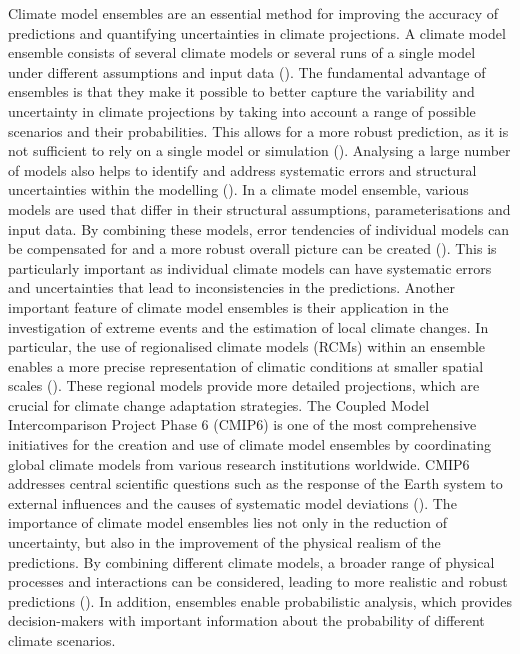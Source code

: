 \documentclass[
]{krantz}
\begin{document}
Climate model ensembles are an essential method for improving the accuracy of predictions and quantifying uncertainties in climate projections. A climate model ensemble consists of several climate models or several runs of a single model under different assumptions and input data (\citet{eyring2016overview}). The fundamental advantage of ensembles is that they make it possible to better capture the variability and uncertainty in climate projections by taking into account a range of possible scenarios and their probabilities. This allows for a more robust prediction, as it is not sufficient to rely on a single model or simulation (\citet{falloon2014ensembles}). Analysing a large number of models also helps to identify and address systematic errors and structural uncertainties within the modelling (\citet{maher2021large}).
In a climate model ensemble, various models are used that differ in their structural assumptions, parameterisations and input data. By combining these models, error tendencies of individual models can be compensated for and a more robust overall picture can be created (\citet{semenov2010use}). This is particularly important as individual climate models can have systematic errors and uncertainties that lead to inconsistencies in the predictions.
Another important feature of climate model ensembles is their application in the investigation of extreme events and the estimation of local climate changes. In particular, the use of regionalised climate models (RCMs) within an ensemble enables a more precise representation of climatic conditions at smaller spatial scales (\citet{maher2021large}). These regional models provide more detailed projections, which are crucial for climate change adaptation strategies.
The Coupled Model Intercomparison Project Phase 6 (CMIP6) is one of the most comprehensive initiatives for the creation and use of climate model ensembles by coordinating global climate models from various research institutions worldwide. CMIP6 addresses central scientific questions such as the response of the Earth system to external influences and the causes of systematic model deviations (\citet{eyring2016overview}).
The importance of climate model ensembles lies not only in the reduction of uncertainty, but also in the improvement of the physical realism of the predictions. By combining different climate models, a broader range of physical processes and interactions can be considered, leading to more realistic and robust predictions (\citet{smith2009bayesian}). In addition, ensembles enable probabilistic analysis, which provides decision-makers with important information about the probability of different climate scenarios.
\end{document}
